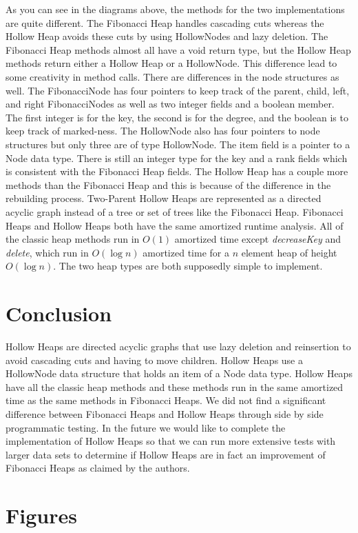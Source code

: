 \documentclass[letter,10pt]{article}
\begin{document}
\quad As you can see in the diagrams above, the methods for the two implementations are quite different. The Fibonacci Heap handles cascading cuts whereas the Hollow Heap avoids these cuts by using HollowNodes and lazy deletion. The Fibonacci Heap methods almost all have a void return type, but the Hollow Heap methods return either a Hollow Heap or a HollowNode. This difference lead to some creativity in method calls. There are differences in the node structures as well. The FibonacciNode has four pointers to keep track of the parent, child, left, and right FibonacciNodes as well as two integer fields and a boolean member. The first integer is for the key, the second is for the degree, and the boolean is to keep track of marked-ness. The HollowNode also has four pointers to node structures but only three are of type HollowNode. The item field is a pointer to a Node data type. There is still an integer type for the key and a rank fields which is consistent with the Fibonacci Heap fields. The Hollow Heap has a couple more methods than the Fibonacci Heap and this is because of the difference in the rebuilding process. Two-Parent Hollow Heaps are represented as a directed acyclic graph instead of a tree or set of trees like the Fibonacci Heap. Fibonacci Heaps and Hollow Heaps both have the same amortized runtime analysis. All of the classic heap methods run in $O(1)$ amortized time except \textit{decreaseKey} and \textit{delete}, which run in $O(\log n)$ amortized time for a $n$ element heap of height $O(\log n)$. The two heap types are both supposedly simple to implement. 

\section{Conclusion}
Hollow Heaps are directed acyclic graphs that use lazy deletion and reinsertion to avoid cascading cuts and having to move children. Hollow Heaps use a HollowNode data structure that holds an item of a Node data type. Hollow Heaps have all the classic heap methods and these methods run in the same amortized time as the same methods in Fibonacci Heaps. We did not find a significant difference between Fibonacci Heaps and Hollow Heaps through side by side programmatic testing. In the future we would like to complete the implementation of Hollow Heaps so that we can run more extensive tests with larger data sets to determine if Hollow Heaps are in fact an improvement of Fibonacci Heaps as claimed by the authors. 

\section{Figures}
\end{document}
